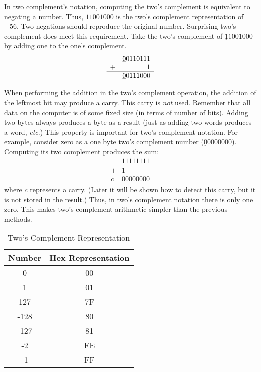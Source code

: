 In two complement's notation, computing the two's complement is equivalent
to negating a number. Thus, $\underline{1}1001000$ is the two's complement
representation of $-56$. Two negations should reproduce the original number.
Surprising two's complement does meet this requirement. Take the two's
complement of $\underline{1}1001000$ by adding one to the one's complement.
\[
\begin{array}{rr}
 & \underline{0}0110111 \\
+&                    1 \\ \hline
 & \underline{0}0111000
\end{array}
\]

When performing the addition in the two's complement operation, the addition
of the leftmost bit may produce a carry. This carry is \emph{not} used. 
Remember that all data on the computer is of some fixed size (in terms of
number of bits). Adding two bytes always produces a byte as a result (just
as adding two words produces a word, {\em etc\/}.) This property is important 
for two's complement notation. For example, consider zero as a one byte
two's complement number ($\underline{0}0000000$). Computing its two complement
produces the sum:
\[
\begin{array}{rr}
 & \underline{1}1111111 \\
+&                    1 \\ \hline
c& \underline{0}0000000
\end{array}
\]
where $c$ represents a carry. (Later it will be shown how to detect this carry,
but it is not stored in the result.) Thus, in two's complement notation there
is only one zero. This makes two's complement arithmetic simpler than the
previous methods.

\begin{table}
\centering
\begin{tabular}{||c|c||}
\hline
Number & Hex Representation \\
\hline
0 & 00 \\
1 & 01 \\
127 & 7F \\
-128 & 80 \\
-127 & 81 \\
-2 & FE \\
-1 & FF \\
\hline
\end{tabular}
\caption{Two's Complement Representation \label{tab:twocomp}}
\end{table}

